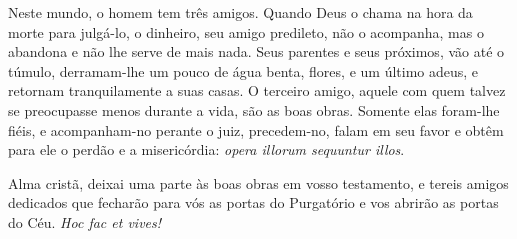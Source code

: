 Neste mundo, o homem tem três amigos. Quando Deus o chama na hora da morte para julgá-lo, o dinheiro, seu amigo predileto, não o acompanha, mas o abandona e não lhe serve de mais nada. Seus parentes e seus próximos, vão até o túmulo, derramam-lhe um pouco de água benta, flores, e um último adeus, e retornam tranquilamente a suas casas. O terceiro amigo, aquele com quem talvez se preocupasse menos durante a vida, são as boas obras. Somente elas foram-lhe fiéis, e acompanham-no perante o juiz, precedem-no, falam em seu favor e obtêm para ele o perdão e a misericórdia: \textit{opera illorum sequuntur illos}. 

Alma cristã, deixai uma parte às boas obras em vosso testamento, e tereis amigos dedicados que fecharão para vós as portas do Purgatório e vos abrirão as portas do Céu. \textit{Hoc fac et vives!}
